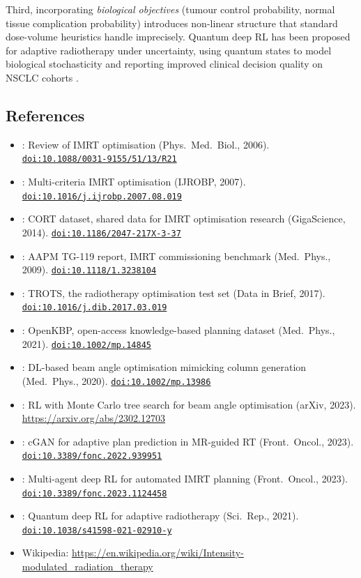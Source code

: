 \documentclass[11pt]{article}
\newcommand{\doi}[1]{\href{https://doi.org/#1}{\texttt{doi:#1}}}
\begin{document}
Third, incorporating \emph{biological objectives} (tumour control probability, normal 
tissue complication probability) introduces non-linear structure that standard 
dose-volume heuristics handle imprecisely. Quantum deep RL has been proposed for 
adaptive radiotherapy under uncertainty, using quantum states to model biological 
stochasticity and reporting improved clinical decision quality on NSCLC cohorts 
\cite{NiraulaQDRL2021}.

\subsection*{References}

\begin{itemize}[noitemsep]
  \item \cite{Bortfeld2006}: Review of IMRT optimisation (Phys.\ Med.\ Biol., 2006).
    \doi{10.1088/0031-9155/51/13/R21}
  \item \cite{Craft2007}: Multi-criteria IMRT optimisation (IJROBP, 2007).
    \doi{10.1016/j.ijrobp.2007.08.019}
  \item \cite{Craft2014}: CORT dataset, shared data for IMRT optimisation research
    (GigaScience, 2014). \doi{10.1186/2047-217X-3-37}
  \item \cite{Ezzell2009}: AAPM TG-119 report, IMRT commissioning benchmark
    (Med.\ Phys., 2009). \doi{10.1118/1.3238104}
  \item \cite{Breedveld2017}: TROTS, the radiotherapy optimisation test set
    (Data in Brief, 2017). \doi{10.1016/j.dib.2017.03.019}
  \item \cite{OpenKBP2021}: OpenKBP, open-access knowledge-based planning dataset
    (Med.\ Phys., 2021). \doi{10.1002/mp.14845}
  \item \cite{Barkousaraie2020}: DL-based beam angle optimisation mimicking column 
    generation (Med.\ Phys., 2020). \doi{10.1002/mp.13986}
  \item \cite{Bao2023}: RL with Monte Carlo tree search for beam angle optimisation 
    (arXiv, 2023). \url{https://arxiv.org/abs/2302.12703}
  \item \cite{Buchanan2023}: cGAN for adaptive plan prediction in MR-guided RT 
    (Front.\ Oncol., 2023). \doi{10.3389/fonc.2022.939951}
  \item \cite{MuAPNLung2023}: Multi-agent deep RL for automated IMRT planning 
    (Front.\ Oncol., 2023). \doi{10.3389/fonc.2023.1124458}
  \item \cite{NiraulaQDRL2021}: Quantum deep RL for adaptive radiotherapy 
    (Sci.\ Rep., 2021). \doi{10.1038/s41598-021-02910-y}
  \item Wikipedia: \url{https://en.wikipedia.org/wiki/Intensity-modulated_radiation_therapy}
\end{itemize}
\end{document}
